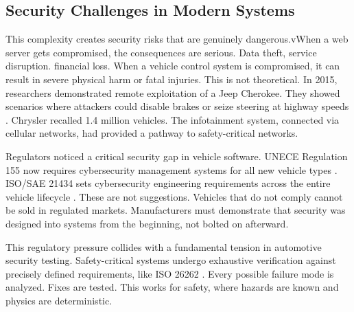 \subsection{Security Challenges in Modern Systems}
\label{sec:security_challenges}

This complexity creates security risks that are genuinely dangerous.vWhen a web server gets compromised, the consequences are serious. Data theft, service disruption. financial loss. When a vehicle control system is compromised, it can result in severe physical harm or fatal injuries. This is not theoretical. In 2015, researchers demonstrated remote exploitation of a Jeep Cherokee. They showed scenarios where attackers could disable brakes or seize steering at highway speeds \cite{MillerValasek2015}. Chrysler recalled 1.4 million vehicles. The infotainment system, connected via cellular networks, had provided a pathway to safety-critical networks.

Regulators noticed a critical security gap in vehicle software. UNECE Regulation 155 now requires cybersecurity management systems for all new vehicle types \cite{UNECER155}. ISO/SAE 21434 sets cybersecurity engineering requirements across the entire vehicle lifecycle \cite{ISO21434}. These are not suggestions. Vehicles that do not comply cannot be sold in regulated markets. Manufacturers must demonstrate that security was designed into systems from the beginning, not bolted on afterward.

This regulatory pressure collides with a fundamental tension in automotive security testing. Safety-critical systems undergo exhaustive verification against precisely defined requirements, like ISO 26262 \cite{ISO26262}. Every possible failure mode is analyzed. Fixes are tested. This works for safety, where hazards are known and physics are deterministic.

